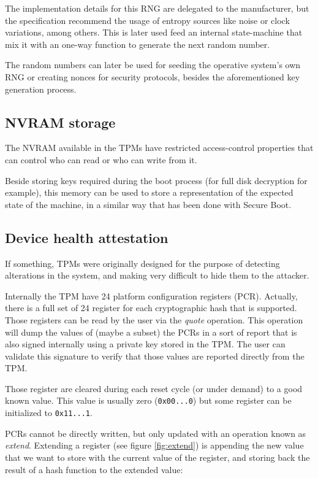 \documentclass{article}
\begin{document}
The implementation details for this RNG are delegated to the
manufacturer, but the specification recommend the usage of entropy
sources like noise or clock variations, among others.  This is later
used feed an internal state-machine that mix it with an one-way
function to generate the next random number.

The random numbers can later be used for seeding the operative
system's own RNG or creating nonces for security protocols, besides
the aforementioned key generation process.

\subsection{NVRAM storage}
The NVRAM available in the TPMs have restricted access-control
properties that can control who can read or who can write from it.

Beside storing keys required during the boot process (for full disk
decryption for example), this memory can be used to store a
representation of the expected state of the machine, in a similar way
that has been done with Secure Boot.

\subsection{Device health attestation}
If something, TPMs were originally designed for the purpose of
detecting alterations in the system, and making very difficult to hide
them to the attacker.

Internally the TPM have 24 platform configuration registers (PCR).
Actually, there is a full set of 24 register for each cryptographic
hash that is supported.  Those registers can be read by the user via
the \emph{quote} operation.  This operation will dump the values of
(maybe a subset) the PCRs in a sort of report that is also signed
internally using a private key stored in the TPM.  The user can
validate this signature to verify that those values are reported
directly from the TPM.

Those register are cleared during each reset cycle (or under demand)
to a good known value. This value is usually zero (\texttt{0x00...0})
but some register can be initialized to \texttt{0x11...1}.

PCRs cannot be directly written, but only updated with an operation
known as \emph{extend}.  Extending a register (see figure
\ref{fig:extend}) is appending the new value that we want to store
with the current value of the register, and storing back the result of
a hash function to the extended value:
\end{document}
